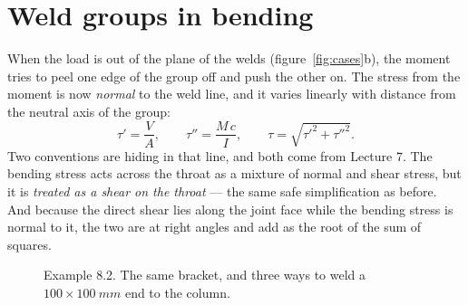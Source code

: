 \documentclass[11pt,a4paper]{article}
\begin{document}
\section{Weld groups in bending}
\label{sec:bending}

When the load is out of the plane of the welds (figure~\ref{fig:cases}b), the moment tries to peel
one edge of the group off and push the other on. The stress from the moment is now \emph{normal}
to the weld line, and it varies linearly with distance from the neutral axis of the group:
\begin{equation}
\tau'=\frac{V}{A},\qquad \tau''=\frac{M\,c}{I},\qquad \tau=\sqrt{\tau'^2+\tau''^2}.
\end{equation}
Two conventions are hiding in that line, and both come from Lecture 7. The bending stress acts
across the throat as a mixture of normal and shear stress, but it is \emph{treated as a shear on
the throat} --- the same safe simplification as before. And because the direct shear lies along
the joint face while the bending stress is normal to it, the two are at right angles and add as
the root of the sum of squares.

\begin{figure}[H]\centering
\resizebox{\textwidth}{!}{}
\caption{Example 8.2. The same bracket, and three ways to weld a $100\times\SI{100}{mm}$ end to the
column.}
\label{fig:bending}
\end{figure}
\end{document}
